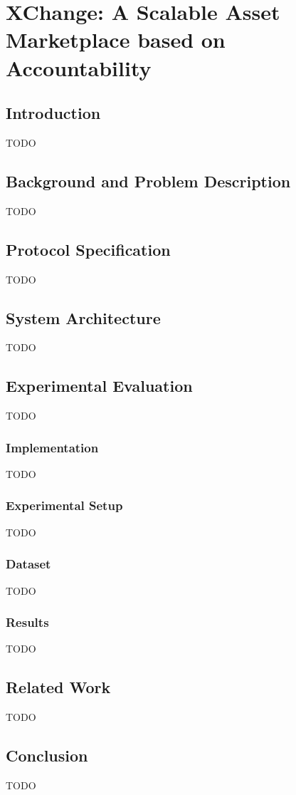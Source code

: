 \chapter{XChange: A Scalable Asset Marketplace based on Accountability}
\label{chapter6}

\section{Introduction}
TODO

\section{Background and Problem Description}
TODO

\section{Protocol Specification}
TODO

\section{System Architecture}
TODO

\section{Experimental Evaluation}
TODO

\subsection{Implementation}
TODO

\subsection{Experimental Setup}
TODO

\subsection{Dataset}
TODO

\subsection{Results}
TODO

\section{Related Work}
TODO

\section{Conclusion}
TODO

\newpage



